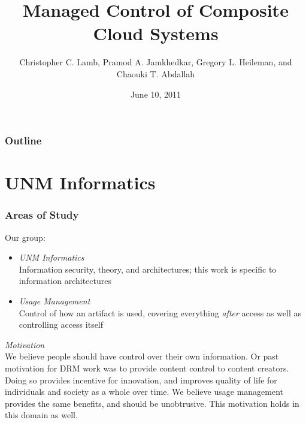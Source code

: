 \documentclass[t, 10pt]{beamer}
\title{Managed Control of Composite Cloud Systems}
\author [Chris]{Christopher C. Lamb, Pramod A. Jamkhedkar, Gregory L. Heileman, and Chaouki T. Abdallah}
\institute[University of New Mexico]{
\inst {}Department of Electrical and Computer Engineering\\
University of New Mexico}
\date{June 10, 2011}
\begin{document}
\begin{frame}
\titlepage
\end{frame}


\begin{frame}
\frametitle{Outline}
\tableofcontents 
\end{frame}

\section{UNM Informatics}
\begin{frame}
\frametitle{Areas of Study}

Our group:
\begin{itemize}
\item \textit{UNM Informatics} \\
 Information security, theory, and architectures; this work is specific to information architectures 
\item \textit{Usage Management} \\
Control of how an artifact is used, covering everything \textit{after} access as well as controlling access itself
\end{itemize}

\textit{Motivation} \\
We believe people should have control over their own information.  Or past motivation for DRM work was to provide content control to content creators.  Doing so provides incentive for innovation, and improves quality of life for individuals and society as a whole over time.  We believe usage management provides the same benefits, and should be unobtrusive.
\newline
\newline
This motivation holds in this domain as well.
\end{frame}
\end{document}
